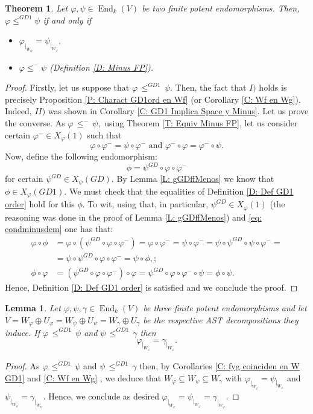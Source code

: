 \documentclass[10pt,a4paper]{amsart}
\newtheorem{thm}[defn]{Theorem}
\newtheorem{lem}[defn]{Lemma}
\theoremstyle{plain}
\theoremstyle{remark}
\numberwithin{equation}{section} \numberwithin{defn}{section}
\newcommand\ed{\operatorname{End}}
\newcommand{\f}{\varphi}
\newcommand{\g}{\psi}
\begin{document}
\begin{thm}\label{T: Charact GD1 Order FP}
Let $\f, \g \in \ed_k(V)$ be two finite potent endomorphisms. Then, $\f \leq^{GD1}\g$ if and only if \begin{itemize}
\item[I.)] $\f_{\vert_{W_{\f}}}=\g_{\vert_{W_{\f}}},$ \\
\item[II.)] $\f\leq^{-}\g$ (Definition \ref{D: Minus FP}).
\end{itemize}
\end{thm}
\begin{proof}
Firstly, let us suppose that $\f \, \leq^{GD1} \, \g .$ Then, the fact that $I)$ holds is precisely Proposition \ref{P: Charact GD1ord en Wf} (or Corollary \ref{C: Wf en Wg}). Indeed, $II)$ was shown in Corollary \ref{C: GD1 Implica Space y Minus}. Let us prove the converse. As $\f \, \leq^{-} \, \g ,$ using Theorem \ref{T: Equiv Minus FP}, let us consider certain $\f^- \in X_{\f}(1)$ such that \begin{equation}\label{eq: condminusdem}
\f \circ \f^- =\g \circ \f^- \text{ and } \f^-\circ \f=\f^- \circ \g. 
\end{equation} Now, define the following endomorphism: $$\phi= \g^{GD}\circ \f \circ \f^{-} $$ for certain $\g^{GD}\in X_{\g}(GD).$ By Lemma \ref{L: gGDffMenos} we know that $\phi \in X_{\f}(GD1).$ We must check that the equalities of Definition \ref{D: Def GD1 order} hold for this $\phi .$ To wit, using that, in particular, $\g^{GD}\in X_{\f}(1)$ (the reasoning was done in the proof of Lemma \ref{L: gGDffMenos}) and \eqref{eq: condminusdem} one has that: \begin{align*}
\f \circ \phi & = \f \circ (\g^{GD}\circ \f \circ \f^{-})= \f \circ \f^- = \g \circ \f^{-}= \g \circ \g^{GD} \circ \g \circ \f^{-}= \\& =\g \circ \g^{GD}\circ \f \circ \f^-=\g \circ \phi, ; \\
\phi \circ \f & =(\g^{GD}\circ \f \circ \f^{-})\circ \f=\g^{GD}\circ \f \circ \f^- \circ \g=\phi \circ \g.
\end{align*} Hence, Definition \ref{D: Def GD1 order} is satisfied and we conclude the proof.
\end{proof}


\begin{lem}\label{L: Transitivity}
Let $\f, \g, \gamma \in \ed_k(V)$ be three finite potent endomorphisms and let $V=W_{\f}\oplus U_{\f}=W_{\g}\oplus U_{\g}=W_{\gamma}\oplus U_{\gamma}$ be the respective AST decompositions they induce. If $\f \, \leq^{GD1} \, \g $ and $\g \, \leq^{GD1} \, \gamma$ then $$\f_{\vert_{W_{\f}}}=\gamma_{\vert_{W_{\f}}}.$$
\end{lem}
\begin{proof}
As $\f \, \leq^{GD1} \, \g $ and $\g \, \leq^{GD1} \, \gamma$ then, by Corollaries \ref{C: fyg coinciden en W GD1} and \ref{C: Wf en Wg} , we deduce that $W_{\f}\subseteq W_{\g}\subseteq W_{\gamma}$ with $\f_{\vert_{W_{\f}}}=\g_{\vert_{W_{\f}}}$ and $\g_{\vert_{W_{\g}}}=\gamma_{\vert_{W_{\g}}}.$ Hence, we conclude as desired $\f_{\vert_{W_{\f}}}=\g_{\vert_{W_{\f}}}=\gamma_{\vert_{W_{\f}}}.$
\end{proof}
\end{document}
